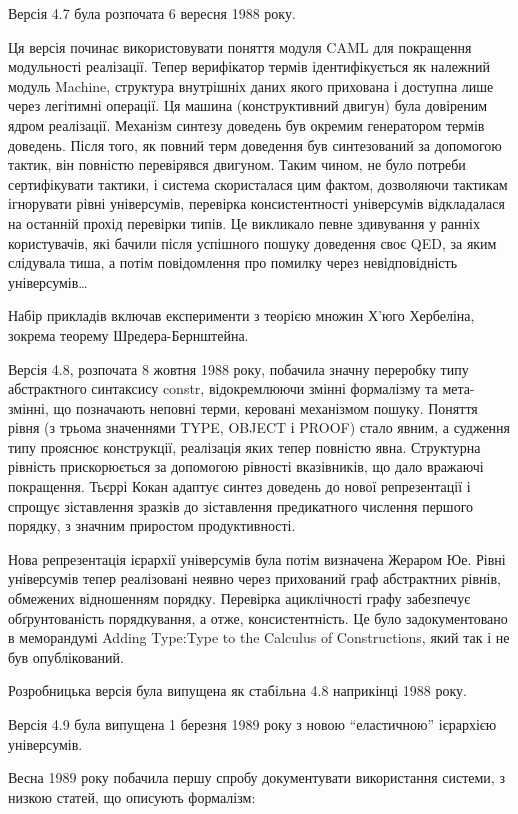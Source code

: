 \documentclass{article}
\begin{document}
Версія 4.7 була розпочата 6 вересня 1988 року.

Ця версія починає використовувати поняття модуля CAML для покращення модульності реалізації. Тепер верифікатор термів ідентифікується як належний модуль Machine, структура внутрішніх даних якого прихована і доступна лише через легітимні операції. Ця машина (конструктивний двигун) була довіреним ядром реалізації. Механізм синтезу доведень був окремим генератором термів доведень. Після того, як повний терм доведення був синтезований за допомогою тактик, він повністю перевірявся двигуном. Таким чином, не було потреби сертифікувати тактики, і система скористалася цим фактом, дозволяючи тактикам ігнорувати рівні універсумів, перевірка консистентності універсумів відкладалася на останній прохід перевірки типів. Це викликало певне здивування у ранніх користувачів, які бачили після успішного пошуку доведення своє QED, за яким слідувала тиша, а потім повідомлення про помилку через невідповідність універсумів…

Набір прикладів включав експерименти з теорією множин Х’юго Хербеліна, зокрема теорему Шредера-Бернштейна.

Версія 4.8, розпочата 8 жовтня 1988 року, побачила значну переробку типу абстрактного синтаксису constr, відокремлюючи змінні формалізму та мета-змінні, що позначають неповні терми, керовані механізмом пошуку. Поняття рівня (з трьома значеннями TYPE, OBJECT і PROOF) стало явним, а судження типу прояснює конструкції, реалізація яких тепер повністю явна. Структурна рівність прискорюється за допомогою рівності вказівників, що дало вражаючі покращення. Тьєррі Кокан адаптує синтез доведень до нової репрезентації і спрощує зіставлення зразків до зіставлення предикатного числення першого порядку, з значним приростом продуктивності.

Нова репрезентація ієрархії універсумів була потім визначена Жераром Юе. Рівні універсумів тепер реалізовані неявно через прихований граф абстрактних рівнів, обмежених відношенням порядку. Перевірка ациклічності графу забезпечує обґрунтованість порядкування, а отже, консистентність. Це було задокументовано в меморандумі Adding Type:Type to the Calculus of Constructions, який так і не був опублікований.

Розробницька версія була випущена як стабільна 4.8 наприкінці 1988 року.

Версія 4.9 була випущена 1 березня 1989 року з новою “еластичною” ієрархією універсумів.

Весна 1989 року побачила першу спробу документувати використання системи, з низкою статей, що описують формалізм:
\end{document}
